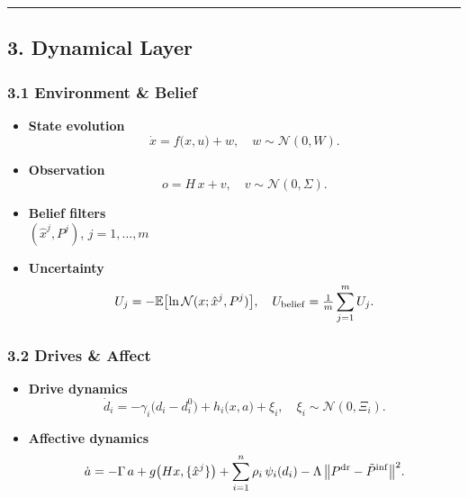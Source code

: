 \documentclass[
]{article}
\providecommand{\tightlist}{%
  \setlength{\itemsep}{0pt}\setlength{\parskip}{0pt}}
\begin{document}
\begin{center}\rule{0.5\linewidth}{0.5pt}\end{center}

\hypertarget{dynamical-layer}{%
\subsection{3. Dynamical Layer}\label{dynamical-layer}}

\hypertarget{environment-belief}{%
\subsubsection{3.1 Environment \& Belief}\label{environment-belief}}

\begin{itemize}
\tightlist
\item
  \textbf{State evolution}\\
  \[
    \dot x = f\bigl(x,u\bigr) + w,\quad w\sim\mathcal N(0,W).
  \]
\item
  \textbf{Observation}\\
  \[
    o = H\,x + v,\quad v\sim\mathcal N(0,\Sigma).
  \]
\item
  \textbf{Belief filters}\\
  \((\hat x^j,P^j)\), \(j=1,\dots,m\)\\
\item
  \textbf{Uncertainty}\\
  \[
    U_j = -\mathbb E\bigl[\ln\mathcal N(x;\hat x^j,P^j)\bigr],\quad
    U_{\rm belief}=\tfrac1m\sum_{j=1}^m U_j.
  \]
\end{itemize}

\hypertarget{drives-affect}{%
\subsubsection{3.2 Drives \& Affect}\label{drives-affect}}

\begin{itemize}
\tightlist
\item
  \textbf{Drive dynamics}\\
  \[
    \dot d_i
    = -\gamma_i\bigl(d_i - d^0_i\bigr)
      + h_i\bigl(x,a\bigr)
      + \xi_i,\quad \xi_i\sim\mathcal N(0,\Xi_i).
  \]
\item
  \textbf{Affective dynamics}\\
  \[
    \dot a
    = -\Gamma\,a
      + g\bigl(Hx,\{\hat x^j\}\bigr)
      + \sum_{i=1}^n \rho_i\,\psi_i(d_i)
      - \Lambda\,\bigl\|P^{\rm dr} - \tilde P^{\rm inf}\bigr\|^2.
  \]
\end{itemize}
\end{document}
